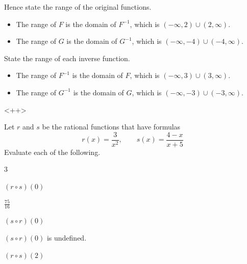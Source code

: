 \begin{exercises}
\begin{problem}
\begin{subproblem}
\begin{shortsolution}
	 \end{shortsolution}
 \end{subproblem}
 \begin{subproblem}
	 Hence state the range of the original functions.
	 \begin{shortsolution}
		 \begin{itemize}
			 \item The range of $F$ is the domain of $F^{-1}$, which is $(-\infty,2)\cup(2,\infty)$.
			 \item The range of $G$ is the domain of $G^{-1}$, which is $(-\infty,-4)\cup(-4,\infty)$.
		 \end{itemize}
	 \end{shortsolution}
 \end{subproblem}
 \begin{subproblem}
	 State the range of each inverse function.
	 \begin{shortsolution}
		 \begin{itemize}
			 \item The range of $F^{-1}$ is the domain of $F$, which is $(-\infty,3)\cup(3,\infty)$.
			 \item The range of $G^{-1}$ is the domain of $G$, which is $(-\infty,-3)\cup(-3,\infty)$.
		 \end{itemize}<++>
	 \end{shortsolution}
 \end{subproblem}
 \end{problem}
 \begin{problem}[Composition]
 Let $r$ and $s$ be the rational functions that have formulas
 \[
	 r(x)=\frac{3}{x^2},\qquad s(x)=\frac{4-x}{x+5}
 \]
 Evaluate each of the following.
 \begin{multicols}{3}
	 \begin{subproblem}
		 $(r\circ s)(0)$
		 \begin{shortsolution}
			 $\frac{75}{16}$
		 \end{shortsolution}
	 \end{subproblem}
	 \begin{subproblem}
		 $(s\circ r)(0)$
		 \begin{shortsolution}
			 $(s\circ r)(0)$ is undefined.
		 \end{shortsolution}
	 \end{subproblem}
	 \begin{subproblem}
		 $(r\circ s)(2)$
		 \begin{shortsolution}

\end{shortsolution}
\end{subproblem}
\end{multicols}
\end{problem}
\end{exercises}
